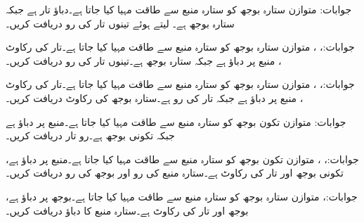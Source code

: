 جوابات:
متوازن ستارہ بوجھ کو ستارہ منبع  سے طاقت مہیا کیا جاتا ہے۔دباؤ تار  ہے جبکہ ستارہ بوجھ  ہے۔ لیتے ہوئے تینوں تار کی رو دریافت کریں۔

جوابات:، ، 
متوازن ستارہ بوجھ کو ستارہ منبع  سے طاقت مہیا کیا جاتا ہے۔تار کی رکاوٹ ، منبع پر دباؤ
  ہے جبکہ ستارہ بوجھ  ہے۔تینوں تار کی رو دریافت کریں۔

جوابات:، ، 
متوازن ستارہ بوجھ کو ستارہ منبع  سے طاقت مہیا کیا جاتا ہے۔تار کی رکاوٹ ، منبع پر دباؤ   ہے جبکہ تار کی رو  ہے۔ستارہ بوجھ کی رکاوٹ دریافت کریں۔

جوابات:
متوازن تکون بوجھ کو ستارہ منبع  سے طاقت مہیا کیا جاتا ہے۔منبع پر دباؤ   ہے جبکہ تکونی بوجھ
  ہے۔رو تار دریافت کریں۔

جوابات:، ، 
متوازن تکون بوجھ کو ستارہ منبع  سے طاقت مہیا کیا جاتا ہے۔منبع پر دباؤ   ہے، تکونی بوجھ
  اور تار کی رکاوٹ  ہے۔ستارہ منبع کی رو  اور بوجھ کی رو  دریافت کریں۔

جوابات:، 
متوازن ستارہ بوجھ کو ستارہ منبع  سے طاقت مہیا کیا جاتا ہے۔بوجھ پر دباؤ   ہے،  بوجھ
  اور تار کی رکاوٹ  ہے۔ستارہ منبع کا دباؤ  دریافت کریں۔

